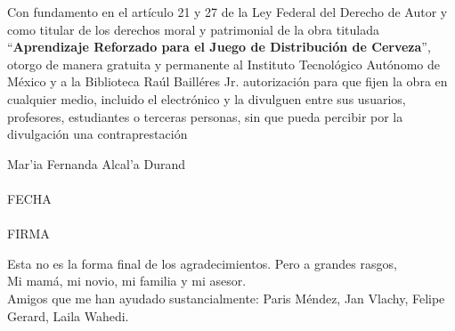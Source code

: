 
\newpage
\mbox{}
\thispagestyle{empty} %

\newpage
\thispagestyle{empty}
Con fundamento en el artículo 21 y 27 de la Ley Federal del Derecho de Autor y como titular de los derechos moral y patrimonial de la obra titulada ``\textbf{Aprendizaje Reforzado para el Juego de Distribuci\'on de Cerveza}'', otorgo de manera gratuita y permanente al Instituto Tecnológico Autónomo de México y a la Biblioteca Raúl Bailléres Jr. autorización para que fijen la obra en cualquier medio, incluido el electrónico y la divulguen entre sus usuarios, profesores, estudiantes o terceras personas, sin que pueda percibir por la divulgación una contraprestación

\vspace{20 mm}
\begin{center}
Mar'ia Fernanda Alcal'a Durand\\

\vspace{20 mm}
\makebox[2in]{\hrulefill}\\
FECHA\\
\vspace{20 mm}
\makebox[2in]{\hrulefill}\\
FIRMA
\end{center}

\newpage
\mbox{}
\thispagestyle{empty} %



Esta no es la forma final de los agradecimientos. Pero a grandes rasgos, \\

Mi mam\'a, mi novio, mi familia y mi asesor.\\

Amigos que me han ayudado sustancialmente: Paris M\'endez, Jan Vlachy, Felipe Gerard, Laila Wahedi.

\newpage
\mbox{}
\thispagestyle{empty} %
